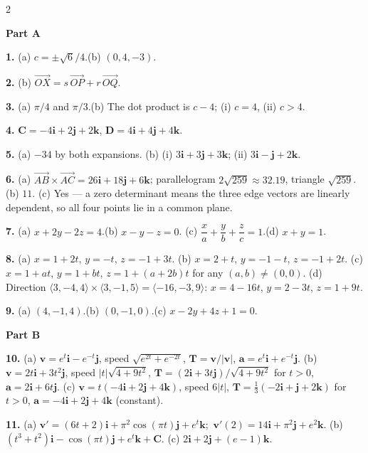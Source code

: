 \documentclass[11pt,oneside]{article}
\newcommand{\bi}{\mathbf{i}}
\newcommand{\bj}{\mathbf{j}}
\newcommand{\bk}{\mathbf{k}}
\newcommand{\bC}{\mathbf{C}}
\newcommand{\bD}{\mathbf{D}}
\newcommand{\bv}{\mathbf{v}}
\newcommand{\ba}{\mathbf{a}}
\newcommand{\bT}{\mathbf{T}}
\begin{document}
{\fontsize{8.8}{11}\selectfont
\setlength{\columnsep}{22pt}
\setlength{\parskip}{3.5pt}
\begin{multicols}{2}
\raggedright

\textbf{Part A}\par\vspace{2pt}

\textbf{1.} (a) $c=\pm\sqrt{6}/4$.\quad (b) $(0,4,-3)$.

\textbf{2.} (b) $\overrightarrow{OX}=s\,\overrightarrow{OP}+r\,\overrightarrow{OQ}$.

\textbf{3.} (a) $\pi/4$ and $\pi/3$.\quad (b) The dot product is $c-4$; (i) $c=4$, (ii) $c>4$.

\textbf{4.} $\bC=-4\bi+2\bj+2\bk$, $\bD=4\bi+4\bj+4\bk$.

\textbf{5.} (a) $-34$ by both expansions.\quad
(b) (i) $3\bi+3\bj+3\bk$; (ii) $3\bi-\bj+2\bk$.

\textbf{6.} (a) $\overrightarrow{AB}\times\overrightarrow{AC}=26\bi+18\bj+6\bk$; parallelogram
$2\sqrt{259}\approx32.19$, triangle $\sqrt{259}$.\quad (b) $11$.\quad
(c) Yes --- a zero determinant means the three edge vectors are linearly dependent, so all four
points lie in a common plane.

\textbf{7.} (a) $x+2y-2z=4$.\quad (b) $x-y-z=0$.\quad
(c) $\dfrac{x}{a}+\dfrac{y}{b}+\dfrac{z}{c}=1$.\quad (d) $x+y=1$.

\textbf{8.} (a) $x=1+2t$, $y=-t$, $z=-1+3t$.\quad
(b) $x=2+t$, $y=-1-t$, $z=-1+2t$.\quad
(c) $x=1+at$, $y=1+bt$, $z=1+(a+2b)t$ for any $(a,b)\neq(0,0)$.\quad
(d) Direction $\langle3,-4,4\rangle\times\langle3,-1,5\rangle=\langle-16,-3,9\rangle$:
$x=4-16t$, $y=2-3t$, $z=1+9t$.

\textbf{9.} (a) $(4,-1,4)$.\quad (b) $(0,-1,0)$.\quad (c) $x-2y+4z+1=0$.

\vspace{4pt}
\textbf{Part B}\par\vspace{2pt}

\textbf{10.} (a) $\bv=e^{t}\bi-e^{-t}\bj$, speed $\sqrt{e^{2t}+e^{-2t}}$,
$\bT=\bv/|\bv|$, $\ba=e^{t}\bi+e^{-t}\bj$.\quad
(b) $\bv=2t\bi+3t^{2}\bj$, speed $|t|\sqrt{4+9t^{2}}$,
$\bT=(2\bi+3t\bj)/\sqrt{4+9t^{2}}$ for $t>0$, $\ba=2\bi+6t\bj$.\quad
(c) $\bv=t(-4\bi+2\bj+4\bk)$, speed $6|t|$, $\bT=\tfrac{1}{3}(-2\bi+\bj+2\bk)$ for $t>0$,
$\ba=-4\bi+2\bj+4\bk$ (constant).

\textbf{11.} (a) $\bv'=(6t+2)\bi+\pi^{2}\cos(\pi t)\bj+e^{t}\bk$;\ $\bv'(2)=14\bi+\pi^{2}\bj+e^{2}\bk$.\quad
(b) $\left(t^{3}+t^{2}\right)\bi-\cos(\pi t)\bj+e^{t}\bk+\bC$.\quad
(c) $2\bi+2\bj+(e-1)\bk$.


\end{multicols}}
\end{document}
